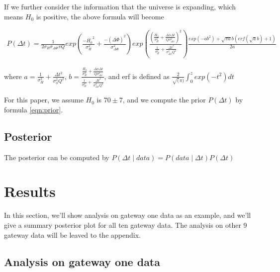 \documentclass[\docopts]{\docclass}
\begin{document}
If we further consider the information that the universe is expanding, which means $H_0$ is positive, the above formula will become

\begin{align}
\label{eqn:prior}
P(\Delta t) = \frac{1}{2\sigma_{H}\sigma_{\Delta \Phi}\pi Q} exp(\frac{-\bar{H_0}^2}{\sigma_H^2}+\frac{-(\bar{\Delta \Phi})^2}{\sigma_{\Delta \Phi}^2})
exp(\frac{(\frac{\bar{H_0}}{\sigma_H^2}+\frac{\bar{\Delta \phi}\Delta t}{Q\sigma_{\Delta \phi}^2})^2}{\frac{1}{\sigma_H^2}+\frac{\Delta t^2}{\sigma_{\Delta \phi}^2 Q^2}}) \frac{exp(-ab^2)+\sqrt{\pi a}b(erf(\sqrt{a}b)+1)}{2a}
\end{align}

 where $a=\frac{1}{\sigma_H^2}+\frac{\Delta t^2}{\sigma_\phi^2Q^2}$, $b=\frac{\frac{\bar{H_0}}{\sigma_H^2}+\frac{\bar{\Delta \phi}\Delta t}{Q\sigma_{\Delta \phi}^2}}{\frac{1}{\sigma_H^2}+\frac{\Delta t^2}{\sigma_{\Delta\phi}^2 Q^2}}$, and erf is defined as $\frac{2}{\sqrt(\pi)}\int_0^z exp(-t^2) dt$

For this paper, we assume $H_0$ is $70 \pm 7$, and we compute the prior $P(\Delta t)$ by formula \ref{eqn:prior}.

\subsection{Posterior}
The posterior can be computed by
$P(\Delta t \mid data) = P(data \mid \Delta t) P(\Delta t)$

\section{Results}
\label{sec:results}
In this section, we'll show analysis on gateway one data as an example, and we'll give a summary posterior plot for all ten gateway data. The analysis on other 9 gateway data  will be leaved to the appendix.

\subsection{Analysis on gateway one data}
\end{document}
